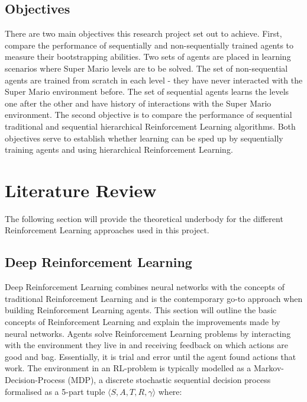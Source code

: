 \documentclass[notitlepage,a4paper,11pt]{article}
\begin{document}
\subsection{Objectives}
There are two main objectives this research project set out to achieve. First, compare the performance of sequentially and non-sequentially trained agents to measure their bootstrapping abilities. Two sets of agents are placed in learning scenarios where Super Mario levels are to be solved. The set of non-sequential agents are trained from scratch in each level - they have never interacted with the Super Mario environment before. The set of sequential agents learns the levels one after the other and have history of interactions with the Super Mario environment. The second objective is to compare the performance of sequential traditional and sequential hierarchical Reinforcement Learning algorithms. Both objectives serve to establish whether learning can be sped up by sequentially training agents and using hierarchical Reinforcement Learning.

\section{Literature Review}
The following section will provide the theoretical underbody for the different Reinforcement Learning approaches used in this project. 


\subsection{Deep Reinforcement Learning}\label{deep_rl}
Deep Reinforcement Learning combines neural networks with the concepts of traditional Reinforcement Learning and is the contemporary go-to approach when building Reinforcement Learning agents. This section will outline the basic concepts of Reinforcement Learning and explain the improvements made by neural networks. Agents solve Reinforcement Learning problems by interacting with the environment they live in and receiving feedback on which actions are good and bag. Essentially, it is trial and error until the agent found actions that work. The environment in an RL-problem is typically modelled as a Markov-Decision-Process (MDP), a discrete stochastic sequential decision process \cite{puterman2014markov} formalised as a 5-part tuple $\langle S, A, T, R, \gamma \rangle$ where:
\end{document}
